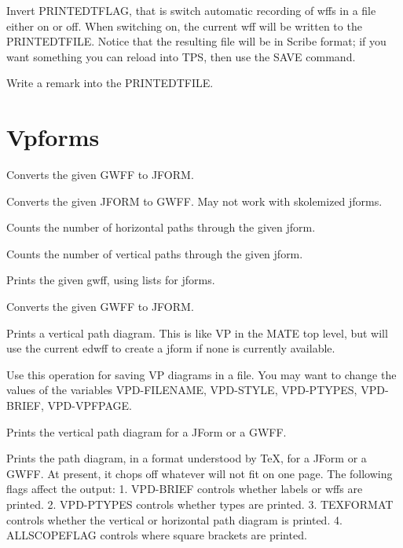 \begin{description} 
\item[O]  
Invert PRINTEDTFLAG, that is switch automatic recording of wffs
in a file either on or off.  When switching on, the current wff will be
written to the PRINTEDTFILE. Notice that the resulting file will be in 
Scribe format; if you want something you can reload into TPS, then use
the SAVE command.

\item[REM]  
Write a remark into the PRINTEDTFILE.
\item
\end{description}

\section{Vpforms}

\begin{description} 
\item[CJFORM]  
Converts the given GWFF to JFORM.

\item[DJFORM]  
Converts the given JFORM to GWFF. May not work with skolemized jforms.

\item[NUM-HPATHS]  
Counts the number of horizontal paths through the given jform.

\item[NUM-VPATHS]  
Counts the number of vertical paths through the given jform.

\item[PJ]  
Prints the given gwff, using lists for jforms.

\item[PROP-CJFORM]  
Converts the given GWFF to JFORM.

\item[VP]  
Prints a vertical path diagram. This is like VP in the MATE 
top level, but will use the current edwff to create a jform 
if none is currently available.

\item[VPD]  
Use this operation for saving VP diagrams in a file. You may want
to change the values of the variables VPD-FILENAME, VPD-STYLE, VPD-PTYPES,
VPD-BRIEF, VPD-VPFPAGE.

\item[VPF]  
Prints the vertical path diagram for a JForm or a GWFF.

\item[VPT]  
Prints the path diagram, in a format understood by TeX, for a JForm 
or a GWFF. At present, it chops off whatever will not fit on one page.
The following flags affect the output:
    1. VPD-BRIEF controls whether labels or wffs are printed.
    2. VPD-PTYPES controls whether types are printed.
    3. TEXFORMAT controls whether the vertical or horizontal path diagram is
printed.
    4. ALLSCOPEFLAG controls where square brackets are printed.
\item
\end{description}


